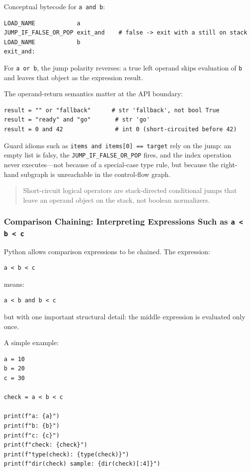 \documentclass[a4paper,twoside]{report}
\begin{document}
Conceptual bytecode for \texttt{a and b}:

\begin{verbatim}
LOAD_NAME            a
JUMP_IF_FALSE_OR_POP exit_and    # false -> exit with a still on stack
LOAD_NAME            b
exit_and:
\end{verbatim}

For \texttt{a or b}, the jump polarity reverses: a true left operand skips evaluation of \texttt{b} and leaves that object as the expression result.

The operand-return semantics matter at the API boundary:

\begin{verbatim}
result = "" or "fallback"      # str 'fallback', not bool True
result = "ready" and "go"       # str 'go'
result = 0 and 42               # int 0 (short-circuited before 42)
\end{verbatim}

Guard idioms such as \texttt{items and items[0] == target} rely on the jump: an empty list is falsy, the \texttt{JUMP\_IF\_FALSE\_OR\_POP} fires, and the index operation never executes---not because of a special-case type rule, but because the right-hand subgraph is unreachable in the control-flow graph.

\begin{quote}
Short-circuit logical operators are stack-directed conditional jumps that leave an operand object on the stack, not boolean normalizers.
\end{quote}

\subsubsection{Comparison Chaining: Interpreting Expressions Such as \texttt{a < b < c}}

Python allows comparison expressions to be chained. The expression:

\begin{verbatim}
a < b < c
\end{verbatim}

means:

\begin{verbatim}
a < b and b < c
\end{verbatim}

but with one important structural detail: the middle expression is evaluated only once.

A simple example:

\begin{verbatim}
a = 10
b = 20
c = 30

check = a < b < c

print(f"a: {a}")
print(f"b: {b}")
print(f"c: {c}")
print(f"check: {check}")
print(f"type(check): {type(check)}")
print(f"dir(check) sample: {dir(check)[:4]}")
\end{verbatim}
\end{document}
